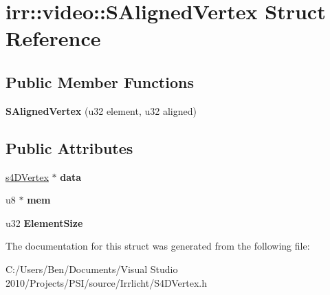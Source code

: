 \hypertarget{structirr_1_1video_1_1_s_aligned_vertex}{\section{irr\-:\-:video\-:\-:S\-Aligned\-Vertex Struct Reference}
\label{structirr_1_1video_1_1_s_aligned_vertex}
}
\subsection*{Public Member Functions}
\begin{DoxyCompactItemize}
\item 
\hypertarget{structirr_1_1video_1_1_s_aligned_vertex_a04511dd65291f9a3b4e15eca8f4e725a}{{\bfseries S\-Aligned\-Vertex} (u32 element, u32 aligned)}\label{structirr_1_1video_1_1_s_aligned_vertex_a04511dd65291f9a3b4e15eca8f4e725a}

\end{DoxyCompactItemize}
\subsection*{Public Attributes}
\begin{DoxyCompactItemize}
\item 
\hypertarget{structirr_1_1video_1_1_s_aligned_vertex_a7a87cdf134cf028a52543233371977cb}{\hyperlink{structirr_1_1video_1_1s4_d_vertex}{s4\-D\-Vertex} $\ast$ {\bfseries data}}\label{structirr_1_1video_1_1_s_aligned_vertex_a7a87cdf134cf028a52543233371977cb}

\item 
\hypertarget{structirr_1_1video_1_1_s_aligned_vertex_a470b06f53060520c93aa1af6f5377027}{u8 $\ast$ {\bfseries mem}}\label{structirr_1_1video_1_1_s_aligned_vertex_a470b06f53060520c93aa1af6f5377027}

\item 
\hypertarget{structirr_1_1video_1_1_s_aligned_vertex_a1550ef4f1434eafeb84e226499bf4f52}{u32 {\bfseries Element\-Size}}\label{structirr_1_1video_1_1_s_aligned_vertex_a1550ef4f1434eafeb84e226499bf4f52}

\end{DoxyCompactItemize}


The documentation for this struct was generated from the following file\-:\begin{DoxyCompactItemize}
\item 
C\-:/\-Users/\-Ben/\-Documents/\-Visual Studio 2010/\-Projects/\-P\-S\-I/source/\-Irrlicht/S4\-D\-Vertex.\-h\end{DoxyCompactItemize}

